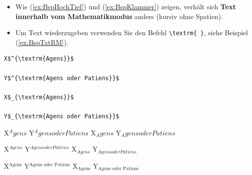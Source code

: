 \begin{frame}[fragile]

\begin{itemize}
	\item Wie (\ref{ex:BspHochTief}) und (\ref{ex:BspKlammer}) zeigen, verhält sich \textbf{Text innerhalb vom Mathematikmodus} anders (kursiv ohne Spatien). 
	
	\item Um Text wiederzugeben verwenden Sie den Befehl \lstinline|\textrm{ }|, siehe Beispiel (\ref{ex:BspTxtRM}).
\end{itemize}


\begin{minipage}[t]{.45\textwidth}
\scriptsize

\begin{lstlisting}
X$^{\textrm{Agens}}$ 

Y$^{\textrm{Agens oder Patiens}}$

X$_{\textrm{Agens}}$ 

Y$_{\textrm{Agens oder Patiens}}$	
\end{lstlisting}

\end{minipage}
\begin{minipage}[t]{.51\textwidth}

\begin{exe}
	
	\begin{xlist}
	\ex X$^Agens$ Y$^Agens oder Patiens$
	\ex X$_Agens$ Y$_Agens oder Patiens$
	\end{xlist} 

	\begin{xlist}
	\ex X$^{Agens}$ Y$^{Agens oder Patiens}$
	\ex X$_{Agens}$ Y$_{Agens oder Patiens}$
	\end{xlist}

\ex \label{ex:BspTxtRM}
\begin{xlist}
	\ex X$^{\textrm{Agens}}$ Y$^{\textrm{Agens oder Patiens}}$
	\ex X$_{\textrm{Agens}}$ Y$_{\textrm{Agens oder Patiens}}$
\end{xlist}
 
\end{exe} 

\end{minipage}

\end{frame}


